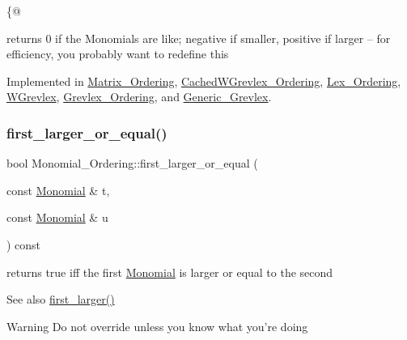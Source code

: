 \{@ 

returns 0 if the Monomials are like; negative if smaller, positive if larger -- for efficiency, you probably want to redefine this 

Implemented in \hyperlink{class_matrix___ordering_a8a6423a305facdaf91a1a3921e0b9f73}{Matrix\+\_\+\+Ordering}, \hyperlink{class_cached_w_grevlex___ordering_ad45e0d824f910059185ff5b63a8e2add}{Cached\+W\+Grevlex\+\_\+\+Ordering}, \hyperlink{class_lex___ordering_ac8ff7b60790ed86bad7b24571ff7a3d1}{Lex\+\_\+\+Ordering}, \hyperlink{class_w_grevlex_a0bef53b45ac32ad5246b438bc4701be1}{W\+Grevlex}, \hyperlink{class_grevlex___ordering_a0a8893d7c44f5d902c9ac5ed426621db}{Grevlex\+\_\+\+Ordering}, and \hyperlink{class_generic___grevlex_afb101ce92463ca2fef409237d005bd87}{Generic\+\_\+\+Grevlex}.

\mbox{\label{class_monomial___ordering_afbae8e00a02ce0334bb0376cf0f0db75}} 
\subsubsection{\texorpdfstring{first\+\_\+larger\+\_\+or\+\_\+equal()}{first\_larger\_or\_equal()}}
{\footnotesize\ttfamily bool Monomial\+\_\+\+Ordering\+::first\+\_\+larger\+\_\+or\+\_\+equal (\begin{DoxyParamCaption}\item[{const \hyperlink{class_monomial}{Monomial} \&}]{t,  }\item[{const \hyperlink{class_monomial}{Monomial} \&}]{u }\end{DoxyParamCaption}) const}



returns {\ttfamily true} iff the first \hyperlink{class_monomial}{Monomial} is larger or equal to the second 

\begin{DoxySeeAlso}{See also}
\hyperlink{class_monomial___ordering_aed41fe82e1ca5cd287a93d287fee7c20}{first\+\_\+larger()} 
\end{DoxySeeAlso}
\begin{DoxyWarning}{Warning}
Do not override unless you know what you're doing 
\end{DoxyWarning}


